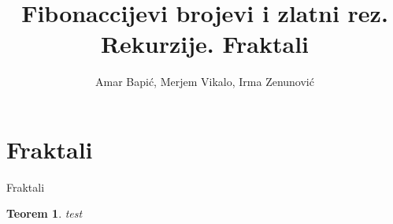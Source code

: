 \documentclass{beamer}
\title{Fibonaccijevi brojevi i zlatni rez. Rekurzije. Fraktali}
\author{Amar Bapić, Merjem Vikalo, Irma Zenunović}
\date{}
\institute{Univerzitet u Tuzli\\Prirodno - matematički fakultet\\ Odsjek Matematika}
\newtheorem{teorem}{Teorem}[section]
\begin{document}
    \begin{frame}[plain]
        \titlepage
    \end{frame}
    \section{Fraktali}
    \begin{frame}{Fraktali}
        \begin{teorem}
            test
        \end{teorem}
    \end{frame}
\end{document}
